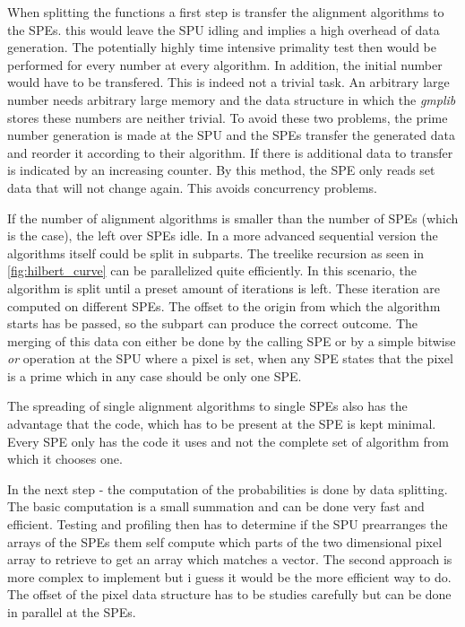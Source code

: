 When splitting the functions a first step is transfer the alignment algorithms to the SPEs. this would leave the SPU idling and implies a high overhead of data generation. The potentially highly time intensive primality test then would be performed for every number at every algorithm. In addition, the initial number would have to be transfered. This is indeed not a trivial task. An arbitrary large number needs arbitrary large memory and the data structure in which the \emph{gmplib} stores these numbers are neither trivial.
To avoid these two problems, the prime number generation is made at the SPU and the SPEs transfer the generated data and reorder it according to their algorithm. If there is additional data to transfer is indicated by an increasing counter. By this method, the SPE only reads set data that will not change again. This avoids concurrency problems.

If the number of alignment algorithms is smaller than the number of SPEs (which is the case), the left over SPEs idle. In a more advanced sequential version the algorithms itself could be split in subparts. The treelike  recursion as seen in \ref{fig:hilbert_curve} can be parallelized quite efficiently. In this scenario, the algorithm is split until a preset amount of iterations is left. These iteration are computed on different SPEs. The offset to the origin from which the algorithm starts has be passed, so the subpart can produce the correct outcome. The merging of this data con either be done by the calling SPE or by a simple bitwise \emph{or} operation at the SPU where a pixel is set, when any SPE states that the pixel is a prime which in any case should be only one SPE.

The spreading of single alignment algorithms to single SPEs also has the advantage that the code, which has to be present at the SPE is kept minimal. Every SPE only has the code it uses and not the complete set of algorithm from which it chooses one.

In the next step - the computation of the probabilities is done by data splitting. The basic computation is a small summation and can be done very fast and efficient. Testing and profiling then has to determine if the SPU prearranges the arrays of the SPEs them self compute which parts of the two dimensional pixel array to retrieve to get an array which matches a vector. The second approach is more complex to implement but i guess it would be the more efficient way to do. The offset of the pixel data structure has to be studies carefully but can be done in parallel at the SPEs.

